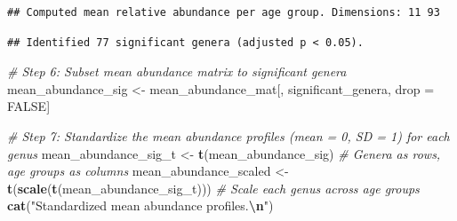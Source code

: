 \documentclass[
]{article}
\newenvironment{Shaded}{\begin{snugshade}}{\end{snugshade}}
\newcommand{\AttributeTok}[1]{\textcolor[rgb]{0.13,0.29,0.53}{#1}}
\newcommand{\CommentTok}[1]{\textcolor[rgb]{0.56,0.35,0.01}{\textit{#1}}}
\newcommand{\ConstantTok}[1]{\textcolor[rgb]{0.56,0.35,0.01}{#1}}
\newcommand{\ControlFlowTok}[1]{\textcolor[rgb]{0.13,0.29,0.53}{\textbf{#1}}}
\newcommand{\DecValTok}[1]{\textcolor[rgb]{0.00,0.00,0.81}{#1}}
\newcommand{\FloatTok}[1]{\textcolor[rgb]{0.00,0.00,0.81}{#1}}
\newcommand{\FunctionTok}[1]{\textcolor[rgb]{0.13,0.29,0.53}{\textbf{#1}}}
\newcommand{\NormalTok}[1]{#1}
\newcommand{\OtherTok}[1]{\textcolor[rgb]{0.56,0.35,0.01}{#1}}
\newcommand{\SpecialCharTok}[1]{\textcolor[rgb]{0.81,0.36,0.00}{\textbf{#1}}}
\newcommand{\StringTok}[1]{\textcolor[rgb]{0.31,0.60,0.02}{#1}}
\begin{document}
\begin{verbatim}
## Computed mean relative abundance per age group. Dimensions: 11 93
\end{verbatim}

\begin{Shaded}
\end{Shaded}

\begin{verbatim}
## Identified 77 significant genera (adjusted p < 0.05).
\end{verbatim}

\begin{Shaded}
\begin{Highlighting}[]
\CommentTok{\# Step 6: Subset mean abundance matrix to significant genera}
\NormalTok{mean\_abundance\_sig }\OtherTok{\textless{}{-}}\NormalTok{ mean\_abundance\_mat[, significant\_genera, drop }\OtherTok{=} \ConstantTok{FALSE}\NormalTok{]}

\CommentTok{\# Step 7: Standardize the mean abundance profiles (mean = 0, SD = 1) for each genus}
\NormalTok{mean\_abundance\_sig\_t }\OtherTok{\textless{}{-}} \FunctionTok{t}\NormalTok{(mean\_abundance\_sig)  }\CommentTok{\# Genera as rows, age groups as columns}
\NormalTok{mean\_abundance\_scaled }\OtherTok{\textless{}{-}} \FunctionTok{t}\NormalTok{(}\FunctionTok{scale}\NormalTok{(}\FunctionTok{t}\NormalTok{(mean\_abundance\_sig\_t)))  }\CommentTok{\# Scale each genus across age groups}
\FunctionTok{cat}\NormalTok{(}\StringTok{"Standardized mean abundance profiles.}\SpecialCharTok{\textbackslash{}n}\StringTok{"}\NormalTok{)}
\end{Highlighting}
\end{Shaded}
\end{document}
